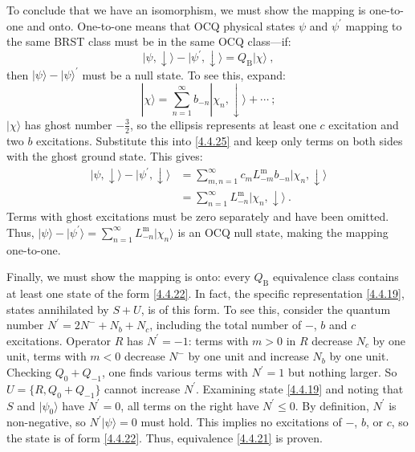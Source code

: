 To conclude that we have an isomorphism, we must show the mapping is one-to-one and onto. One-to-one means that OCQ physical states $\psi$ and $\psi^{\prime}$ mapping to the same BRST class must be in the same OCQ class—if:
\begin{equation}
|\psi, \downarrow\rangle- |\psi^{\prime}, \downarrow \rangle=Q_{\mathrm{B}}|\chi\rangle \:, \label{4.4.25}
\end{equation}
then $|\psi\rangle-|\psi\rangle^{\prime}$ must be a null state. To see this, expand:
\begin{equation}
|\chi\rangle=\sum_{n=1}^{\infty} b_{-n}|\chi_{n}, \downarrow\rangle+\cdots \:;\label{4.4.26}
\end{equation}
$|\chi\rangle$ has ghost number $-\frac{3}{2}$, so the ellipsis represents at least one $c$ excitation and two $b$ excitations. Substitute this into \eqref{4.4.25} and keep only terms on both sides with the ghost ground state. This gives:
\begin{align}
|\psi, \downarrow\rangle- |\psi^{\prime}, \downarrow\rangle &=\sum_{m, n=1}^{\infty} c_{m} L_{-m}^{\mathrm{m}} b_{-n}|\chi_{n}, \downarrow\rangle \nonumber \\
&=\sum_{n=1}^{\infty} L_{-n}^{\mathrm{m}}|\chi_{n}, \downarrow\rangle \:. \label{4.4.27}
\end{align}
Terms with ghost excitations must be zero separately and have been omitted. Thus, $|\psi\rangle-|\psi^{\prime}\rangle=\sum_{n=1}^{\infty} L_{-n}^{\mathrm{m}}|\chi_{n}\rangle$ is an OCQ null state, making the mapping one-to-one.

Finally, we must show the mapping is onto: every $Q_{\mathrm{B}}$ equivalence class contains at least one state of the form \eqref{4.4.22}. In fact, the specific representation \eqref{4.4.19}, states annihilated by $S+U$, is of this form. To see this, consider the quantum number $N^{\prime}=2 N^{-}+N_{b}+N_{c}$, including the total number of $-$, $b$ and $c$ excitations. Operator $R$ has $N^{\prime}=-1$: terms with $m>0$ in $R$ decrease $N_{c}$ by one unit, terms with $m<0$ decrease $N^{-}$ by one unit and increase $N_{b}$ by one unit. Checking $Q_{0}+Q_{-1}$, one finds various terms with $N^{\prime}=1$ but nothing larger. So $U=\{R, Q_{0}+Q_{-1}\}$ cannot increase $N^{\prime}$. Examining state \eqref{4.4.19} and noting that $S$ and $|\psi_{0}\rangle$ have $N^{\prime}=0$, all terms on the right have $N^{\prime} \leq 0$. By definition, $N^{\prime}$ is non-negative, so $N^{\prime}|\psi\rangle=0$ must hold. This implies no excitations of $-$, $b$, or $c$, so the state is of form \eqref{4.4.22}. Thus, equivalence \eqref{4.4.21} is proven.

